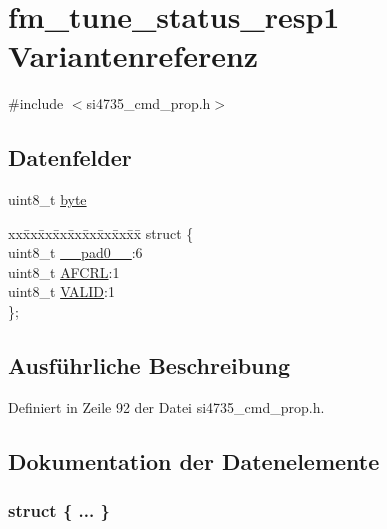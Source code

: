 \hypertarget{unionfm__tune__status__resp1}{}\section{fm\+\_\+tune\+\_\+status\+\_\+resp1 Variantenreferenz}
\label{unionfm__tune__status__resp1}


{\ttfamily \#include $<$si4735\+\_\+cmd\+\_\+prop.\+h$>$}

\subsection*{Datenfelder}
\begin{DoxyCompactItemize}
\item 
uint8\+\_\+t \hyperlink{unionfm__tune__status__resp1_a96f44d20f1dbf1c8785a7bc99a46164c}{byte}
\item 
\begin{tabbing}
xx\=xx\=xx\=xx\=xx\=xx\=xx\=xx\=xx\=\kill
struct \{\\
\>uint8\_t \hyperlink{unionfm__tune__status__resp1_a8b4eebe79ded0459acec2f4950102ba3}{\_\_pad0\_\_}:6\\
\>uint8\_t \hyperlink{unionfm__tune__status__resp1_aec3ecfbd976645f2d3d4067f32271635}{AFCRL}:1\\
\>uint8\_t \hyperlink{unionfm__tune__status__resp1_a58bd81dc31c117b187f38fbc118b393e}{VALID}:1\\
\}; \\

\end{tabbing}\end{DoxyCompactItemize}


\subsection{Ausführliche Beschreibung}


Definiert in Zeile 92 der Datei si4735\+\_\+cmd\+\_\+prop.\+h.



\subsection{Dokumentation der Datenelemente}
\hypertarget{unionfm__tune__status__resp1_acb9c89fce5a2d4e2caf05a866e8148c3}{}\subsubsection[{"@11}]{\setlength{\rightskip}{0pt plus 5cm}struct \{ ... \} }\label{unionfm__tune__status__resp1_acb9c89fce5a2d4e2caf05a866e8148c3}
\hypertarget{unionfm__tune__status__resp1_a8b4eebe79ded0459acec2f4950102ba3}{}
